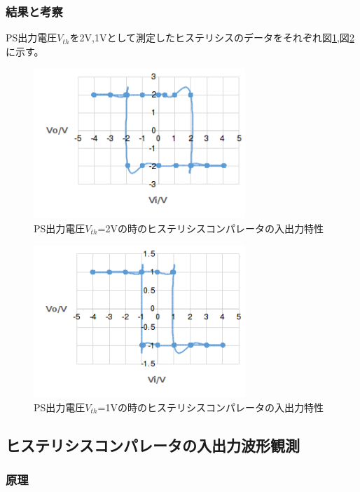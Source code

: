 \documentclass[11pt,a4j]{jsarticle}
\begin{document}
   \subsubsection{結果と考察}
    PS出力電圧$V_{th}$を2V,1Vとして測定したヒステリシスのデータをそれぞれ図\ref{fig:1_2_histeri_Vth2},図\ref{fig:1_2_histeri_Vth1}に示す。
    
    \begin{figure}[htbp]
  \centering
  \includegraphics[width=8cm,clip]{1_2_histeri_Vth2.png}
  \caption{PS出力電圧$V_{th}$=2Vの時のヒステリシスコンパレータの入出力特性}
  \label{fig:1_2_histeri_Vth2}
 \end{figure}%
    
 \begin{figure}[htbp]
  \centering
  \includegraphics[width=8cm,clip]{1_2_histeri_Vth1.png}
  \caption{PS出力電圧$V_{th}$=1Vの時のヒステリシスコンパレータの入出力特性}
  \label{fig:1_2_histeri_Vth1}
 \end{figure}%
    
    
    
  \subsection{ヒステリシスコンパレータの入出力波形観測}
   \subsubsection{原理}
    
\end{document}
